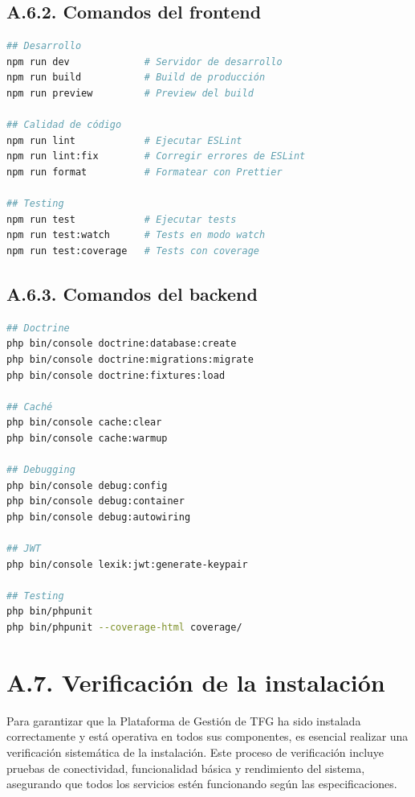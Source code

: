 \documentclass[12pt,a4paper,oneside]{report}
\begin{document}
\subsection{A.6.2. Comandos del
frontend}\label{a.6.2.-comandos-del-frontend}

\begin{lstlisting}[language=bash]
## Desarrollo
npm run dev             # Servidor de desarrollo
npm run build           # Build de producción
npm run preview         # Preview del build

## Calidad de código
npm run lint            # Ejecutar ESLint
npm run lint:fix        # Corregir errores de ESLint
npm run format          # Formatear con Prettier

## Testing
npm run test            # Ejecutar tests
npm run test:watch      # Tests en modo watch
npm run test:coverage   # Tests con coverage
\end{lstlisting}

\subsection{A.6.3. Comandos del
backend}\label{a.6.3.-comandos-del-backend}

\begin{lstlisting}[language=bash]
## Doctrine
php bin/console doctrine:database:create
php bin/console doctrine:migrations:migrate
php bin/console doctrine:fixtures:load

## Caché
php bin/console cache:clear
php bin/console cache:warmup

## Debugging
php bin/console debug:config
php bin/console debug:container
php bin/console debug:autowiring

## JWT
php bin/console lexik:jwt:generate-keypair

## Testing
php bin/phpunit
php bin/phpunit --coverage-html coverage/
\end{lstlisting}

\section{A.7. Verificación de la
instalación}\label{a.7.-verificaciuxf3n-de-la-instalaciuxf3n}

Para garantizar que la Plataforma de Gestión de TFG ha sido instalada
correctamente y está operativa en todos sus componentes, es esencial
realizar una verificación sistemática de la instalación. Este proceso de
verificación incluye pruebas de conectividad, funcionalidad básica y
rendimiento del sistema, asegurando que todos los servicios estén
funcionando según las especificaciones.
\end{document}
